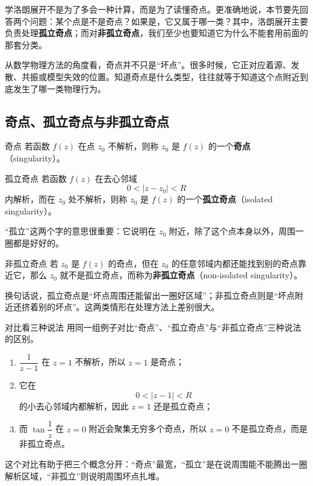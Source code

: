 \begin{wulibj}[本节的目标]
学洛朗展开不是为了多会一种计算，而是为了读懂奇点。更准确地说，本节要先回答两个问题：某个点是不是奇点？如果是，它又属于哪一类？其中，洛朗展开主要负责处理\textbf{孤立奇点}；而对\textbf{非孤立奇点}，我们至少也要知道它为什么不能套用前面的那套分类。
\end{wulibj}

从数学物理方法的角度看，奇点并不只是``坏点''。很多时候，它正对应着源、发散、共振或模型失效的位置。知道奇点是什么类型，往往就等于知道这个点附近到底发生了哪一类物理行为。

\subsection{奇点、孤立奇点与非孤立奇点}

\begin{dingliyi}{奇点}{}
若函数 $f(z)$ 在点 $z_0$ 不解析，则称 $z_0$ 是 $f(z)$ 的一个\textbf{奇点}（singularity）。
\end{dingliyi}

\begin{dingliyi}{孤立奇点}{}
若函数 $f(z)$ 在去心邻域
\[
    0<|z-z_0|<R
\]
内解析，而在 $z_0$ 处不解析，则称 $z_0$ 是 $f(z)$ 的一个\textbf{孤立奇点}（isolated singularity）。
\end{dingliyi}

``孤立''这两个字的意思很重要：它说明在 $z_0$ 附近，除了这个点本身以外，周围一圈都是好好的。

\begin{dingliyi}{非孤立奇点}{}
若 $z_0$ 是 $f(z)$ 的奇点，但在 $z_0$ 的任意邻域内都还能找到别的奇点靠近它，那么 $z_0$ 就不是孤立奇点，而称为\textbf{非孤立奇点}（non-isolated singularity）。
\end{dingliyi}

换句话说，孤立奇点是``坏点周围还能留出一圈好区域''；非孤立奇点则是``坏点附近还挤着别的坏点''。这两类情形在处理方法上差别很大。

\begin{lizi}{对比看三种说法}{}
用同一组例子对比``奇点''、``孤立奇点''与``非孤立奇点''三种说法的区别。

\begin{jie}
\begin{enumerate}
    \item $\dfrac{1}{z-1}$ 在 $z=1$ 不解析，所以 $z=1$ 是奇点；
    \item 它在
    \[
        0<|z-1|<R
    \]
    的小去心邻域内都解析，因此 $z=1$ 还是孤立奇点；
    \item 而 $\tan\dfrac{1}{z}$ 在 $z=0$ 附近会聚集无穷多个奇点，所以 $z=0$ 不是孤立奇点，而是非孤立奇点。
\end{enumerate}

这个对比有助于把三个概念分开：``奇点''最宽，``孤立''是在说周围能不能腾出一圈解析区域，``非孤立''则说明周围坏点扎堆。
\end{jie}
\end{lizi}


